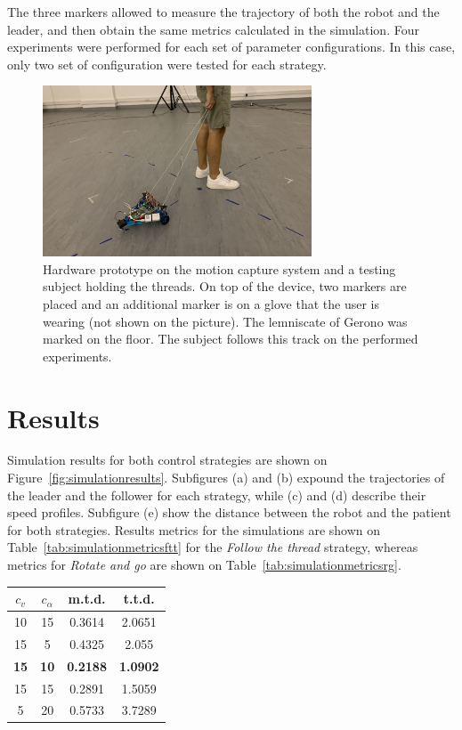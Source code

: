\documentclass[journal]{IEEEtran}
\begin{document}
The three markers allowed to measure the trajectory of both the robot and the leader, and then obtain the same metrics calculated in the simulation.  Four experiments were performed for each set of parameter configurations.  In this case, only two set of configuration were tested for each strategy.

\begin{figure}[h!]
\centering
\includegraphics[width=8cm]{images/capture.png}
\caption{Hardware prototype on the motion capture system and a testing subject holding the threads.  On top of the device, two markers are placed and an additional marker is on a glove that the user is wearing (not shown on the picture).  The lemniscate of Gerono was marked on the floor.  The subject follows this track on the performed experiments.}
\label{fig:capturesystem}
\end{figure}



\section{Results} \label{Results}
\label{results}

Simulation results for both control strategies are shown on Figure~\ref{fig:simulationresults}. Subfigures (a) and (b) expound the trajectories of the leader and the follower for each strategy, while (c) and (d) describe their speed profiles.  Subfigure (e) show the distance between the robot and the patient for both strategies.  Results metrics for the simulations are shown on Table~\ref{tab:simulationmetricsftt} for the \textit{Follow the thread} strategy, whereas metrics for \textit{Rotate and go} are shown on Table~\ref{tab:simulationmetricsrg}.


\begin{center}
\begin{tabular}{ |c|c|c|c| }
\hline
$c_v$ & $c_{\alpha}$ & m.t.d. & t.t.d. \\
\hline
10  &   15  & 0.3614 & 2.0651\\
15  &   5  & 0.4325 & 2.055\\
\textbf{15}  &   \textbf{10}  & \textbf{0.2188} & \textbf{1.0902}\\
15  &   15  & 0.2891 & 1.5059\\
5  &   20  & 0.5733 & 3.7289\\
\hline
\end{tabular}
\label{tab:simulationmetricsftt}
\end{center}
\end{document}
